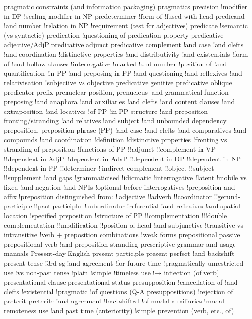 pragmatic constraints (and information packaging)
pragmatics
precision
!modifier in DP
!scaling modifier in NP
predeterminer
!form of
!fused with head
predicand
!and number
!relation in NP
!requirement (test for adjectives)
predicate
!semantic (vs syntactic)
predication
!questioning of
predication property
predicative adjective/AdjP
predicative adjunct
predicative complement
!and case
!and clefts
!and coordination
!distinctive properties
!and distributivity
!and existentials
!form of
!and hollow clauses
!interrogative
!marked
!and number
!position of
!and quantification
!in PP
!and preposing in PP
!and questioning
!and reflexives
!and relativisation
!subjective vs objective
predicative genitive
predicative oblique
predicator
prefix
prenuclear position, prenucleus
!and grammatical function
preposing
!and anaphora
!and auxiliaries
!and clefts
!and content clauses
!and extraposition
!and locatives
!of PP
!in PP structure
!and preposition fronting/stranding
!and relatives
!and subject
!and unbounded dependency
preposition, preposition phrase (PP)
!and case
!and clefts
!and comparatives
!and compounds
!and coordination
!definition
!distinctive properties
!fronting vs stranding of preposition
!functions of PP
!!adjunct
!!complement in VP
!!dependent in AdjP
!!dependent in AdvP
!!dependent in DP
!!dependent in NP
!!dependent in PP
!!determiner
!!indirect complement
!!object
!!subject
!!supplement
!and gaps
!grammaticised
!idiomatic
!interrogative
!latent
!mobile vs fixed
!and negation
!and NPIs
!optional before interrogatives
!preposition and affix
!preposition distinguished from:
!!adjective
!!adverb
!!coordinator
!!gerund-participle
!!past participle
!!subordinator
!referential
!and reflexives
!and spatial location
!specified preposition
!structure of PP
!!complementation
!!!double complementation
!!modification
!!position of head
!and subjunctive
!transitive vs intransitive
!verb + preposition combinations
!weak forms
prepositional passive
prepositional verb
!and preposition stranding
prescriptive grammar and usage manuals
Present-day English
present participle
present perfect
!and backshift
present tense
!3rd sg
!and agreement
!for future time
!pragmatically unrestricted use
!vs non-past tense
!plain
!simple
!timeless use
!→ inflection (of verb)
presentational clause
presentational status
presupposition
!cancellation of
!and clefts
!existential
!pragmatic
!of questions (Q-A presuppositions)
!rejection of
preterit
preterite
!and agreement
!backshifted
!of modal auxiliaries
!modal remoteness use
!and past time (anteriority)
!simple
prevention (verb, etc., of)
